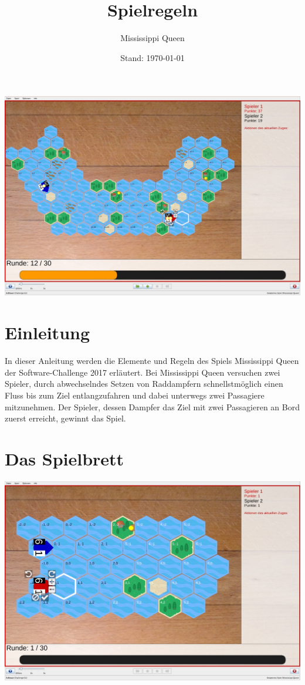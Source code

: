\documentclass[12pt,a4paper, ngerman, oneside]{scrartcl}
\title{Spielregeln}
\subtitle{Mississippi Queen}
\date{Stand: \today}
\begin{document}
\maketitle
\includegraphics[width=\textwidth]{bilder/spielfeld-gross.jpg}
\vspace*{\fill}

\newpage
\tableofcontents
\thispagestyle{empty}
\newpage
\setcounter{page}{1}

\section{Einleitung}

In dieser Anleitung werden die Elemente und Regeln des Spiels Mississippi Queen
der Software-Challenge 2017 erläutert. Bei Mississippi Queen versuchen zwei
Spieler, durch abwechselndes Setzen von Raddampfern schnellstmöglich einen Fluss
bis zum Ziel entlangzufahren und dabei unterwegs zwei Passagiere mitzunehmen.
Der Spieler, dessen Dampfer das Ziel mit zwei Passagieren an Bord zuerst
erreicht, gewinnt das Spiel.


\section{Das Spielbrett}

\includegraphics[width=\textwidth]{bilder/spielfeld-anfang.jpg}
\end{document}
